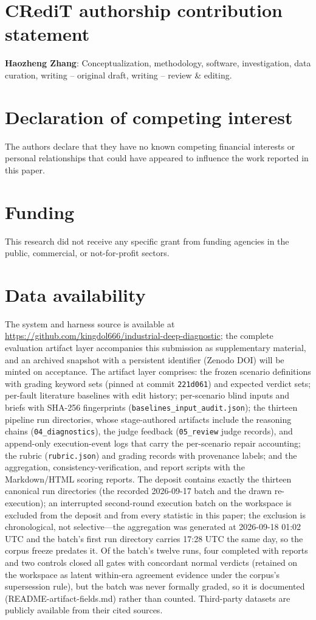 \documentclass[preprint,10pt]{elsarticle}
\begin{document}
\section*{CRediT authorship contribution statement}
\textbf{Haozheng Zhang}: Conceptualization, methodology, software, investigation, data curation, writing -- original draft, writing -- review \& editing.

\section*{Declaration of competing interest}
The authors declare that they have no known competing financial interests or personal relationships that could have appeared to influence the work reported in this paper.

\section*{Funding}
This research did not receive any specific grant from funding agencies in the public, commercial, or not-for-profit sectors.

\section*{Data availability}
The system and harness source is available at \url{https://github.com/kingdol666/industrial-deep-diagnostic}; the complete evaluation artifact layer accompanies this submission as supplementary material, and an archived snapshot with a persistent identifier (Zenodo DOI) will be minted on acceptance. The artifact layer comprises: the frozen scenario definitions with grading keyword sets (pinned at commit \texttt{221d061}) and expected verdict sets; per-fault literature baselines with edit history; per-scenario blind inputs and briefs with SHA-256 fingerprints (\texttt{baselines\_input\_audit.json}); the thirteen pipeline run directories, whose stage-authored artifacts include the reasoning chains (\texttt{04\_diagnostics}), the judge feedback (\texttt{05\_review} judge records), and append-only execution-event logs that carry the per-scenario repair accounting; the rubric (\texttt{rubric.json}) and grading records with provenance labels; and the aggregation, consistency-verification, and report scripts with the Markdown/HTML scoring reports. The deposit contains exactly the thirteen canonical run directories (the recorded 2026-09-17 batch and the drawn re-execution); an interrupted second-round execution batch on the workspace is excluded from the deposit and from every statistic in this paper; the exclusion is chronological, not selective---the aggregation was generated at 2026-09-18 01:02 UTC and the batch's first run directory carries 17:28 UTC the same day, so the corpus freeze predates it. Of the batch's twelve runs, four completed with reports and two controls closed all gates with concordant normal verdicts (retained on the workspace as latent within-era agreement evidence under the corpus's supersession rule), but the batch was never formally graded, so it is documented (README-artifact-fields.md) rather than counted. Third-party datasets are publicly available from their cited sources.
\end{document}
